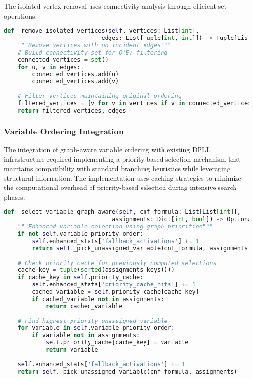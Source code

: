 The isolated vertex removal uses connectivity analysis through efficient set operations:

\begin{lstlisting}[language=Python, caption=Efficient Vertex Filtering]
def _remove_isolated_vertices(self, vertices: List[int], 
                            edges: List[Tuple[int, int]]) -> Tuple[List[int], List[Tuple[int, int]]]:
    """Remove vertices with no incident edges"""
    # Build connectivity set for O(E) filtering
    connected_vertices = set()
    for u, v in edges:
        connected_vertices.add(u)
        connected_vertices.add(v)
    
    # Filter vertices maintaining original ordering
    filtered_vertices = [v for v in vertices if v in connected_vertices]
    return filtered_vertices, edges
\end{lstlisting}

\subsubsection{Variable Ordering Integration}

The integration of graph-aware variable ordering with existing DPLL infrastructure required implementing a priority-based selection mechanism that maintains compatibility with standard branching heuristics while leveraging structural information. The implementation uses caching strategies to minimize the computational overhead of priority-based selection during intensive search phases:

\begin{lstlisting}[language=Python, caption=Priority-Based Variable Selection]
def _select_variable_graph_aware(self, cnf_formula: List[List[int]], 
                               assignments: Dict[int, bool]) -> Optional[int]:
    """Enhanced variable selection using graph priorities"""
    if not self.variable_priority_order:
        self.enhanced_stats['fallback_activations'] += 1
        return self._pick_unassigned_variable(cnf_formula, assignments)
    
    # Check priority cache for previously computed selections
    cache_key = tuple(sorted(assignments.keys()))
    if cache_key in self.priority_cache:
        self.enhanced_stats['priority_cache_hits'] += 1
        cached_variable = self.priority_cache[cache_key]
        if cached_variable not in assignments:
            return cached_variable
    
    # Find highest priority unassigned variable
    for variable in self.variable_priority_order:
        if variable not in assignments:
            self.priority_cache[cache_key] = variable
            return variable
    
    self.enhanced_stats['fallback_activations'] += 1
    return self._pick_unassigned_variable(cnf_formula, assignments)
\end{lstlisting}

